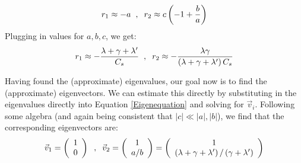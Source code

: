 \begin{align*}
    r_1\approx-a\hspace{2mm},\hspace{2mm} r_2\approx c\left(-1 +\frac{b}{a}\right)
\end{align*}
Plugging in values for $a,b,c$, we get:
\begin{align*}
    r_1\approx-\frac{\lambda+\gamma+\lambda'}{C_s}\hspace{2mm},\hspace{2mm}
    r_2\approx-\frac{\lambda\gamma}{\left( \lambda+\gamma+\lambda' \right)C_s}
\end{align*}

Having found the (approximate) eigenvalues, our goal now is to find the (approximate) eigenvectors. We can estimate this directly by substituting in the eigenvalues directly into Equation \ref{Eigenequation} and solving for $\vec{v}_i$. Following some algebra (and again being consistent that $|c|\ll |a|,|b|$), we find that the corresponding eigenvectors are:
\begin{align*}
    \vec{v}_1= \left( \begin{array}{c}
        1  \\
        0
    \end{array} \right)
    \hspace{2mm},\hspace{2mm}
    \vec{v}_2= \left( \begin{array}{c}
        1  \\
        a/b
    \end{array} \right)
    = \left( \begin{array}{c}
        1  \\
        \left( \lambda+\gamma+\lambda' \right)/\left(\gamma+\lambda' \right)
    \end{array} \right)
\end{align*}

